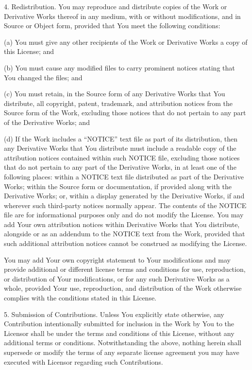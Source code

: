 \documentclass[]{article}
\begin{document}
4. Redistribution. You may reproduce and distribute copies of the Work
or Derivative Works thereof in any medium, with or without
modifications, and in Source or Object form, provided that You meet the
following conditions:

(a) You must give any other recipients of the Work or Derivative Works a
copy of this License; and

(b) You must cause any modified files to carry prominent notices stating
that You changed the files; and

(c) You must retain, in the Source form of any Derivative Works that You
distribute, all copyright, patent, trademark, and attribution notices
from the Source form of the Work, excluding those notices that do not
pertain to any part of the Derivative Works; and

(d) If the Work includes a ``NOTICE'' text file as part of its
distribution, then any Derivative Works that You distribute must include
a readable copy of the attribution notices contained within such NOTICE
file, excluding those notices that do not pertain to any part of the
Derivative Works, in at least one of the following places: within a
NOTICE text file distributed as part of the Derivative Works; within the
Source form or documentation, if provided along with the Derivative
Works; or, within a display generated by the Derivative Works, if and
wherever such third-party notices normally appear. The contents of the
NOTICE file are for informational purposes only and do not modify the
License. You may add Your own attribution notices within Derivative
Works that You distribute, alongside or as an addendum to the NOTICE
text from the Work, provided that such additional attribution notices
cannot be construed as modifying the License.

You may add Your own copyright statement to Your modifications and may
provide additional or different license terms and conditions for use,
reproduction, or distribution of Your modifications, or for any such
Derivative Works as a whole, provided Your use, reproduction, and
distribution of the Work otherwise complies with the conditions stated
in this License.

5. Submission of Contributions. Unless You explicitly state otherwise,
any Contribution intentionally submitted for inclusion in the Work by
You to the Licensor shall be under the terms and conditions of this
License, without any additional terms or conditions. Notwithstanding the
above, nothing herein shall supersede or modify the terms of any
separate license agreement you may have executed with Licensor regarding
such Contributions.
\end{document}
